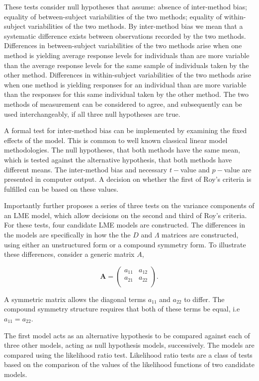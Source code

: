 \documentclass[12pt, a4paper]{report}
\theoremstyle{plain}
\theoremstyle{definition}
\theoremstyle{remark}
\begin{document}
These tests consider null hypotheses that assume: absence of inter-method bias; equality of between-subject variabilities of the two methods; equality of within-subject variabilities of the two methods. By inter-method bias we mean that a systematic difference exists between observations recorded by the two methods. Differences in between-subject variabilities of the two methods arise when one method is yielding average response levels for individuals than are more variable than the average response levels for the same sample of individuals taken by the other method.  Differences in within-subject variabilities of the two methods arise when one method is yielding responses for an individual than are more variable than the responses for this same individual taken by the other method. The two methods of measurement can be considered to agree, and subsequently can be used interchangeably, if all three null hypotheses are true.

A formal test for inter-method bias can be implemented by examining the fixed effects of the model. This is common to well known classical linear model methodologies. The null hypotheses, that both methods have the same mean, which is tested against the alternative hypothesis, that both methods have different means.
The inter-method bias and necessary $t-$value and $p-$value are presented in computer output. A decision on whether the first of Roy's criteria is fulfilled can be based on these values.

Importantly \citet{ARoy2009} further proposes a series of three tests on the variance components of an LME model, which allow decisions on the second and third of Roy's criteria. For these tests, four candidate LME models are constructed. The differences in the models are specifically in how the the $D$ and $\Lambda$ matrices are constructed, using either an unstructured form or a compound symmetry form. To illustrate these differences, consider a generic matrix $A$,

\[
\boldsymbol{A} = \left( \begin{array}{cc}
a_{11} & a_{12}  \\
a_{21} & a_{22}  \\
\end{array}\right).
\]

A symmetric matrix allows the diagonal terms $a_{11}$ and $a_{22}$ to differ. The compound symmetry structure requires that both of these terms be equal, i.e $a_{11} = a_{22}$.

The first model acts as an alternative hypothesis to be compared against each of three other models, acting as null hypothesis models, successively. The models are compared using the likelihood ratio test. Likelihood ratio tests are a class of tests based on the comparison of the values of the likelihood functions of two candidate models. 
\end{document}

